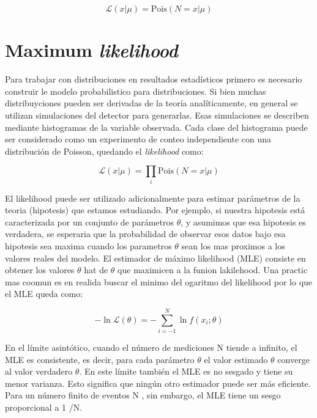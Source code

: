 \begin{equation}
	\mathcal{L}(x|\mu) = \text{Pois}(N=x|\mu) 
\end{equation}

\section{Maximum \textit{likelihood}}

Para trabajar con distribuciones en resultados estadísticos primero es necesario construir le modelo probabilistico para distribuciones. Si bien muchas distribuyciones pueden ser derivadas de la teoría analíticamente, en general se utilizan simulaciones del detector para generarlas. Esas simulaciones se describen mediante histogramas de la variable observada. Cada clase del histograma puede ser considerado como un experimento de conteo independiente con una distribución de Poisson, quedando el \textit{likelihood} como:

\begin{equation}
	\mathcal{L}(x|\mu) = \prod_i \text{Pois}(N=x|\mu) 
\end{equation}


El likelihood puede ser utilizado adicionalmente para estimar parámetros de la teoria (hipotesis) que estamos estudiando. Por ejemplo, si nuestra hipotesis está caracterizada por un conjunto de parámetros \textbf{$\theta$}, y asumimos que esa hipotesis es verdadera, se esperaria que la probabilidad de observar esos datos bajo esa hipotesis sea maxima cuando los parametros \textbf{$\theta$} sean los mas proximos a los valores reales del modelo. El estimador de máximo likelihood (MLE) consiste en obtener los valores \textbf{$\theta$} hat de \textbf{$\theta$} que maximicen a la funion lakilehood. Una practic mas coomun es en realida buscar el minimo del ogaritmo del likelihood por lo que el MLE queda como:

\begin{equation}
	-\ln{\mathcal{L}(\theta)} = - \sum_{i=-1}^{N}\ln{f(x_i; \theta)}
\end{equation}



En el límite asintótico, cuando el número de mediciones N tiende a infinito, el MLE es consistente,
es decir, para cada parámetro \textbf{$\theta$} el valor estimado \textbf{$\theta$} converge al valor verdadero \textbf{$\theta$}. En este límite
también el MLE es no sesgado y tiene su menor varianza. Esto significa que ningún otro estimador
puede ser más eficiente. Para un número finito de eventos N , sin embargo, el MLE tiene un sesgo
proporcional a 1 /N.


